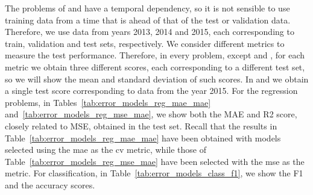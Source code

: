 The problems of  and  have a temporal dependency, so it is not sensible to use training data from a time that is ahead of that of the test or validation data. Therefore, we use data from years 2013, 2014 and 2015, each corresponding to train, validation and test sets, respectively.
%
We consider different metrics to measure the test performance. Therefore, in every problem, except  and , for each metric we obtain three different scores, each corresponding to a different test set, so we will show the mean and standard deviation of such scores. In  and  we obtain a single test score corresponding to data from the year 2015.
% 
For the regression problems, in Tables~\ref{tab:error_models_reg_mae_mae} and~\ref{tab:error_models_reg_mse_mae}, we show both the MAE and R2 score, closely related to MSE, obtained in the test set. 
Recall that the results in Table~\ref{tab:error_models_reg_mae_mae} have been obtained with models selected using the \acrshort{mae} as the \acrshort{cv} metric, while those of Table~\ref{tab:error_models_reg_mse_mae} have been selected with the \acrshort{mse} as the metric.
%
For classification, in Table~\ref{tab:error_models_class_f1}, we show the F1 and the accuracy scores.
%






